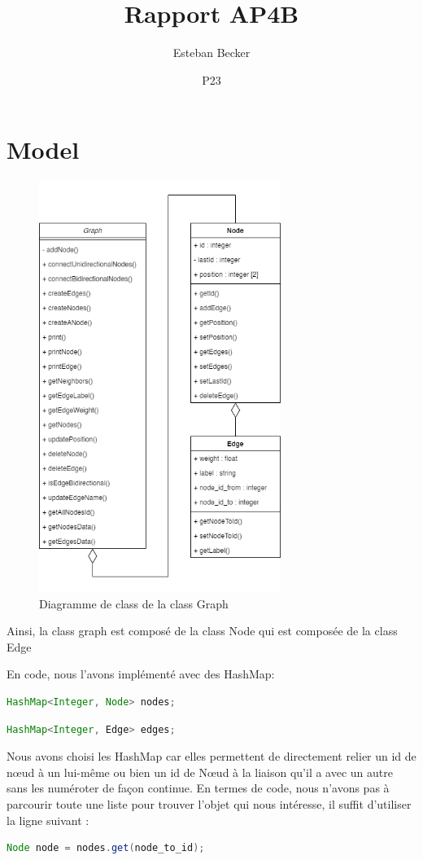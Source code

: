 \documentclass[a4paper]{article}
\title{Rapport AP4B}
\author{Esteban Becker}
\date{P23}
\begin{document}
\maketitle

\section{Model}

\begin{figure}[h]
\centering
\includegraphics[width=0.7\textwidth]{report/Diagram/classGraph.png}
\caption{Diagramme de class de la class Graph}
\end{figure}

Ainsi, la class graph est composé de la class Node qui est composée de la class Edge

En code, nous l'avons implémenté avec des HashMap:

\begin{lstlisting}[language=java]
HashMap<Integer, Node> nodes;
\end{lstlisting}
\begin{lstlisting}[language=java]
HashMap<Integer, Edge> edges;
\end{lstlisting}

Nous avons choisi les HashMap car elles permettent de directement relier un id de nœud à un lui-même ou bien un id de Nœud à la liaison qu'il a avec un autre sans les numéroter de façon continue. En termes de code, nous n'avons pas à parcourir toute une liste pour trouver l'objet qui nous intéresse, il suffit d'utiliser la ligne suivant :

\begin{lstlisting}[language=java]
Node node = nodes.get(node_to_id);
\end{lstlisting}
\end{document}
